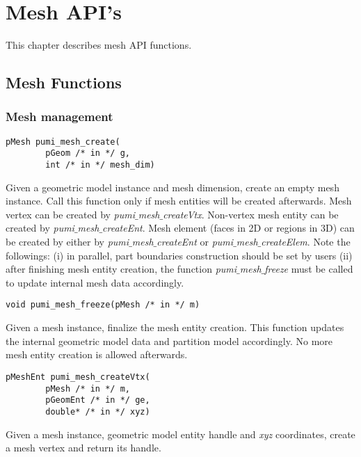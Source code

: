 \section{Mesh API's}

This chapter describes mesh API functions.

\subsection{Mesh Functions}

\subsubsection{Mesh management}
\begin{verbatim}
pMesh pumi_mesh_create(
        pGeom /* in */ g, 
        int /* in */ mesh_dim)
\end{verbatim}\vspace{-.5cm}\hspace{1cm}   	
Given a geometric model instance and mesh dimension, create an empty mesh instance. Call this function only if mesh entities will be created afterwards. Mesh vertex can be created by \emph{pumi}$\_$\emph{mesh}$\_$\emph{createVtx}. Non-vertex mesh entity can be created by \emph{pumi}$\_$\emph{mesh}$\_$\emph{createEnt}. Mesh element (faces in 2D or regions in 3D) can be created by either by \emph{pumi}$\_$\emph{mesh}$\_$\emph{createEnt} or \emph{pumi}$\_$\emph{mesh}$\_$\emph{createElem}. Note the followings: (i) in parallel, part boundaries construction should be set by users (ii) after finishing mesh entity creation, the function \emph{pumi}$\_$\emph{mesh}$\_$\emph{freeze} must be called to update internal mesh data accordingly.

\begin{verbatim}
void pumi_mesh_freeze(pMesh /* in */ m)
\end{verbatim}\vspace{-.5cm}\hspace{1cm}   	
Given a mesh instance, finalize the mesh entity creation. This function updates the internal geometric model data and partition model accordingly. No more mesh entity creation is allowed afterwards.

\begin{verbatim}
pMeshEnt pumi_mesh_createVtx(
        pMesh /* in */ m, 
        pGeomEnt /* in */ ge, 
        double* /* in */ xyz)
\end{verbatim}\vspace{-.5cm}\hspace{1cm}
Given a mesh instance, geometric model entity handle and \emph{xyz} coordinates, create a mesh vertex and return its handle.

